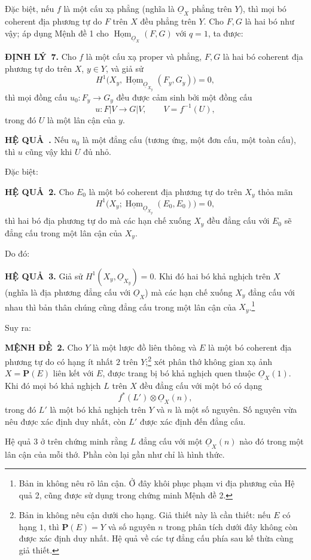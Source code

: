 \documentclass[11pt,twoside,openany]{book}
\numberwithin{equation}{section}
\newcommand{\src}[1]{%
  \phantomsection\hypertarget{src:\fgasourceid:#1}{}%
  \marginpar{\raggedleft\footnotesize\sffamily #1}%
}
\newcommand{\fgasourceid}{unset}
\newcommand{\Osh}{\underline{O}}
\newcommand{\Homsh}{\underline{\operatorname{Hom}}}
\newcommand{\result}[2]{\par\medskip\noindent\textbf{#1\if\relax\detokenize{#2}\relax\else\ #2\fi.}\quad}
\begin{document}
Đặc biệt, nếu $f$ là một cấu xạ phẳng (nghĩa là $\Osh_X$ phẳng trên $Y$), thì
mọi bó coherent địa phương tự do $F$ trên $X$ đều phẳng trên $Y$. Cho $F,G$ là
hai bó như vậy; áp dụng Mệnh đề 1 cho $\Homsh_{\Osh_X}(F,G)$ với $q=1$, ta
được:

\result{ĐỊNH LÝ}{7} Cho $f$ là một cấu xạ proper và phẳng, $F,G$ là hai bó
coherent địa phương tự do trên $X$, $y\in Y$, và giả sử
\[
  H^1\bigl(X_y,\Homsh_{\Osh_{X_y}}(F_y,G_y)\bigr)=0,
\]
thì mọi đồng cấu $u_0:F_y\longrightarrow G_y$ đều được cảm sinh bởi một đồng
cấu
\[
  u:F|V\longrightarrow G|V,
  \qquad V=f^{-1}(U),
\]
trong đó $U$ là một lân cận của $y$.

\result{HỆ QUẢ}{} Nếu $u_0$ là một đẳng cấu (tương ứng, một đơn cấu, một toàn
cấu), thì $u$ cũng vậy khi $U$ đủ nhỏ.

Đặc biệt:

\src{202}
\result{HỆ QUẢ}{2} Cho $E_0$ là một bó coherent địa phương tự do trên $X_y$
thỏa mãn
\[
  H^1\bigl(X_y;\Homsh_{\Osh_{X_y}}(E_0,E_0)\bigr)=0,
\]
thì hai bó địa phương tự do mà các hạn chế xuống $X_y$ đều đẳng cấu
với $E_0$ sẽ đẳng cấu trong một lân cận của $X_y$.

Do đó:

\result{HỆ QUẢ}{3} Giả sử $H^1(X_y,\Osh_{X_y})=0$. Khi đó hai bó khả nghịch
trên $X$ (nghĩa là địa phương đẳng cấu với $\Osh_X$) mà các hạn chế xuống
$X_y$ đẳng cấu với nhau thì bản thân chúng cũng đẳng cấu trong một lân cận của $X_y$.\footnote{Bản in không nêu rõ lân cận. Ở đây khôi phục phạm vi địa phương của Hệ quả 2, cũng được sử dụng trong chứng minh Mệnh đề 2.}

Suy ra:

\result{MỆNH ĐỀ}{2} Cho $Y$ là một lược đồ liên thông và $E$ là một bó
coherent địa phương tự do có hạng ít nhất $2$ trên $Y$;\footnote{Bản in không
nêu cận dưới cho hạng. Giả thiết này là cần thiết: nếu $E$ có
hạng $1$, thì $\mathbf P(E)=Y$ và số nguyên $n$ trong phân tích dưới đây không
còn được xác định duy nhất. Hệ quả về các tự đẳng cấu phía sau kế thừa cùng
giả thiết.} xét phân thớ không gian xạ ảnh $X=\mathbf P(E)$ liên kết với $E$,
được trang bị bó khả nghịch quen thuộc $\Osh_X(1)$. Khi đó mọi bó khả nghịch
$L$ trên $X$ đều đẳng cấu với một bó có dạng
\[
  f^*(L')\otimes\Osh_X(n),
\]
trong đó $L'$ là một bó khả nghịch trên $Y$ và $n$ là một số nguyên. Số nguyên
vừa nêu được xác định duy nhất, còn $L'$ được xác định đến đẳng cấu.

Hệ quả 3 ở trên chứng minh rằng $L$ đẳng cấu với một $\Osh_X(n)$ nào đó trong
một lân cận của mỗi thớ. Phần còn lại gần như chỉ là hình thức.
\end{document}
